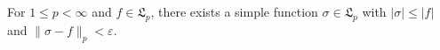 For $1 \leq p < \infty$ and $f \in \mathfrak{L}_p$, there exists a simple function $\sigma \in \mathfrak{L}_p$ with $|\sigma| \leq |f|$ and $\|\sigma - f\|_p < \varepsilon$.

